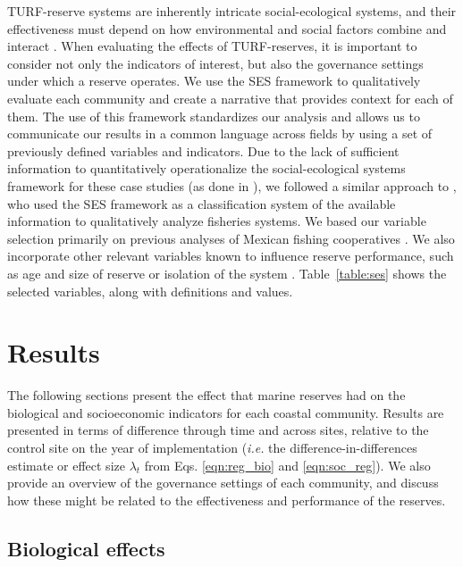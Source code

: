 \documentclass[10pt,letterpaper]{article}
\providecommand{\DIFaddtex}[1]{{\protect\color{blue}\uwave{#1}}} %
\providecommand{\DIFaddbegin}{} %
\providecommand{\DIFaddend}{} %
\providecommand{\DIFadd}[1]{\texorpdfstring{\DIFaddtex{#1}}{#1}} %
\newcommand{\DIFaddincludegraphics}[2][]{{\color{blue}\fbox{\DIFOincludegraphics[#1]{#2}}}} %
\DeclareRobustCommand{\DIFaddbegin}{\DIFOaddbegin \let\includegraphics\DIFaddincludegraphics} %
\DeclareRobustCommand{\DIFaddend}{\DIFOaddend \let\includegraphics\DIFOincludegraphics} %
\begin{document}
TURF-reserve systems are inherently intricate social-ecological systems, and their effectiveness must depend on how environmental and social factors combine and interact \cite{ostrom_2009,gelcich_2015}. When evaluating the effects of TURF-reserves, it is important to consider not only the indicators of interest, but also the governance settings under which a reserve operates. We use the SES framework to qualitatively evaluate each community and create a narrative that provides context for each of them. The use of this framework standardizes our analysis and allows us to communicate our results in a common language across fields by using a set of previously defined variables and indicators. Due to the lack of sufficient information to quantitatively operationalize the social-ecological systems framework for these case studies (as done in \DIFaddbegin \DIFadd{Leslie et al }\DIFaddend \cite{leslie_2015-na}), we followed a similar approach to \cite{basurto_2013-oq}, who used the SES framework as a classification system of the available information to qualitatively analyze fisheries systems. We based our variable selection primarily on previous analyses of Mexican fishing cooperatives \cite{leslie_2015-na,basurto_2013-oq}. We also incorporate other relevant variables known to influence reserve performance, such as age and size of reserve or isolation of the system \cite{difranco_2016-Xw,edgar_2014-UO}. Table~\ref{table:ses} shows the selected variables, along with definitions and values.

\section*{Results}

The following sections present the effect that marine reserves had on the biological and socioeconomic indicators for each coastal community. Results are presented in terms of difference through time and across sites, relative to the control site on the year of implementation (\emph{i.e.} the difference-in-differences estimate or effect size $\lambda_t$ from Eqs. \ref{eqn:reg_bio} and \ref{eqn:soc_reg}). We also provide an overview of the governance settings of each community, and discuss how these might be related to the effectiveness and performance of the reserves.

\subsection*{Biological effects}
\end{document}
